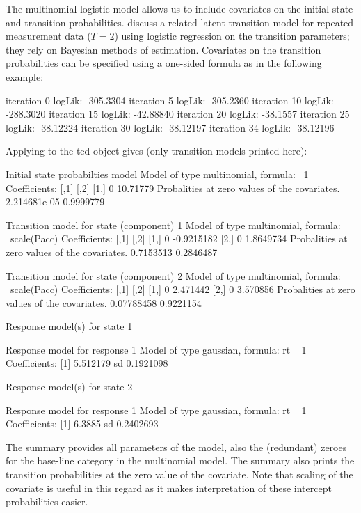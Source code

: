\documentclass[article]{jss}
\begin{document}
The multinomial logistic model allows us to include covariates on the
initial state and transition probabilities.  \citet{Chung2007} discuss
a related latent transition model for repeated measurement data
($T=2$) using logistic regression on the transition parameters; they
rely on Bayesian methods of estimation.  Covariates on the transition
probabilities can be specified using a one-sided formula as in the
following example:
\begin{Schunk}
\begin{Soutput}
iteration 0 logLik: -305.3304 
iteration 5 logLik: -305.2360 
iteration 10 logLik: -288.3020 
iteration 15 logLik: -42.88840 
iteration 20 logLik: -38.1557 
iteration 25 logLik: -38.12224 
iteration 30 logLik: -38.12197 
iteration 34 logLik: -38.12196 
\end{Soutput}
\end{Schunk}

Applying  to the ted object gives (only transition models
printed here): 
\begin{Schunk}
\begin{Soutput}
Initial state probabilties model 
Model of type multinomial, formula: ~1
Coefficients: 
     [,1]     [,2]
[1,]    0 10.71779
Probalities at zero values of the covariates.
2.214681e-05 0.9999779 

Transition model for state (component) 1 
Model of type multinomial, formula: ~scale(Pacc)
Coefficients: 
     [,1]       [,2]
[1,]    0 -0.9215182
[2,]    0  1.8649734
Probalities at zero values of the covariates.
0.7153513 0.2846487 

Transition model for state (component) 2 
Model of type multinomial, formula: ~scale(Pacc)
Coefficients: 
     [,1]     [,2]
[1,]    0 2.471442
[2,]    0 3.570856
Probalities at zero values of the covariates.
0.07788458 0.9221154 


Response model(s) for state 1 

Response model for response 1 
Model of type gaussian, formula: rt ~ 1
Coefficients: 
[1] 5.512179
sd  0.1921098 


Response model(s) for state 2 

Response model for response 1 
Model of type gaussian, formula: rt ~ 1
Coefficients: 
[1] 6.3885
sd  0.2402693 
\end{Soutput}
\end{Schunk}

The summary provides all parameters of the model, also the (redundant)
zeroes for the base-line category in the multinomial model.  The
summary also prints the transition probabilities at the zero value of
the covariate.  Note that scaling of the covariate is useful in this
regard as it makes interpretation of these intercept probabilities
easier.
\end{document}
